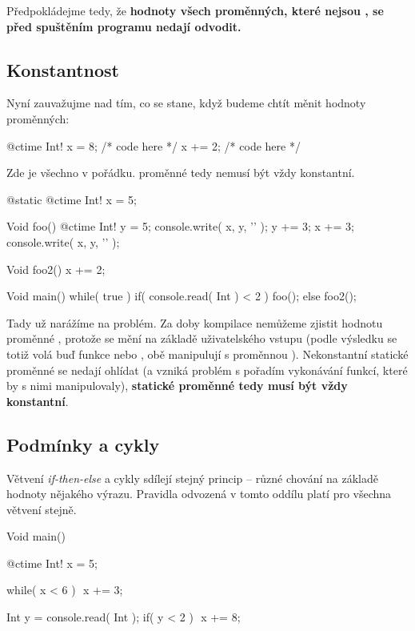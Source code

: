 Předpokládejme tedy, že \textbf{hodnoty všech proměnných, které nejsou \ctime, se před spuštěním programu nedají odvodit.}

\subsection{Konstantnost}
Nyní zauvažujme nad tím, co se stane, když budeme chtít měnit hodnoty \ctime proměnných:

\begin{code}
@ctime Int! x = 8;
/* code here */
x += 2;
/* code here */
\end{code}

Zde je všechno v pořádku. \ctime proměnné tedy nemusí být vždy konstantní.

\begin{code}
@static @ctime Int! x = 5;

Void foo() {
	@ctime Int! y = 5;
	console.write( x, y, '\n' );
	y += 3;
	x += 3;
	console.write( x, y, '\n' );
}

Void foo2() {
	x += 2;
}

Void main() {
	while( true ) {
		if( console.read( Int ) < 2 )
			foo();
		else
			foo2();
	}
}
\end{code}

Tady už narážíme na problém. Za doby kompilace nemůžeme zjistit hodnotu proměnné , protože se mění na základě uživatelského vstupu (podle výsledku  se totiž volá buď funkce  nebo , obě manipulují s proměnnou ). Nekonstantní statické proměnné se nedají ohlídat (a vzniká problém s pořadím vykonávání funkcí, které by s nimi manipulovaly), \textbf{\ctime statické proměnné tedy musí být vždy konstantní}.

\subsection{Podmínky a cykly}
Větvení \textit{if-then-else} a cykly sdílejí stejný princip -- různé chování na základě hodnoty nějakého výrazu. Pravidla odvozená v tomto oddílu platí pro všechna větvení stejně.

\begin{code}
Void main() {
	@ctime Int! x = 5;
	
	while( x < 6 ) $\label{ctime:branch:1}$
		x += 3;

	Int y = console.read( Int );
	if( y < 2 ) $\label{ctime:branch:2}$
		x += 8;
}
\end{code}

